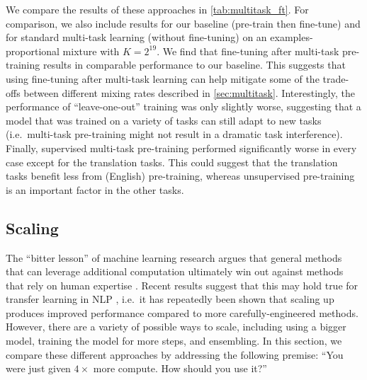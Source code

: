 We compare the results of these approaches in \ref{tab:multitask_ft}.
For comparison, we also include results for our baseline (pre-train then fine-tune) and for standard multi-task learning (without fine-tuning) on an examples-proportional mixture with $K=2^{19}$. We find that fine-tuning after multi-task pre-training results in comparable performance to our baseline. This suggests that using fine-tuning after multi-task learning can help mitigate some of the trade-offs between different mixing rates described in \ref{sec:multitask}.
Interestingly, the performance of ``leave-one-out'' training was only slightly worse, suggesting that a model that was trained on a variety of tasks can still adapt to new tasks (i.e.\ multi-task pre-training might not result in a dramatic task interference). Finally, supervised multi-task pre-training performed significantly worse in every case except for the translation tasks. This could suggest that the translation tasks benefit less from (English) pre-training, whereas unsupervised pre-training is an important factor in the other tasks.

\subsection{Scaling}
\label{sec:scaling}

The ``bitter lesson'' of machine learning research argues that general methods that can leverage additional computation ultimately win out against methods that rely on human expertise \citep{sutton2019bitter,hestness2017deep,shazeer2017outrageously,jozefowicz2016exploring,mahajan2018exploring,shazeer2018mesh,shazeer2017outrageously,huang2018gpipe,keskar2019ctrl}. Recent results suggest that this may hold true for transfer learning in NLP \citep{liu2019roberta,radford2019language,yang2019xlnet,lan2019albert}, i.e.\ it has repeatedly been shown that scaling up produces improved performance compared to more carefully-engineered methods. However, there are a variety of possible ways to scale, including using a bigger model, training the model for more steps, and ensembling. In this section, we compare these different approaches by addressing the following premise: ``You were just given $4\times$ more compute. How should you use it?''

